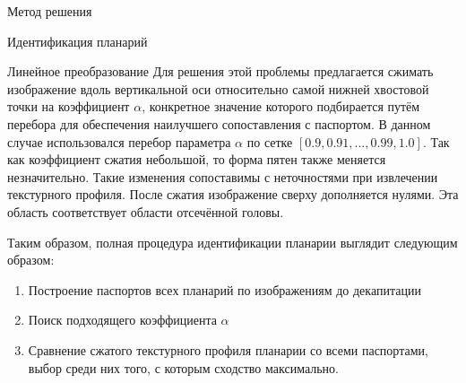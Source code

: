 \documentclass{article}
\begin{document}
\begin{section}{Метод решения}
\begin{subsection}{Идентификация планарий}
\begin{subsubsection}{Линейное преобразование}
Для решения этой проблемы предлагается сжимать изображение вдоль вертикальной оси относительно самой нижней хвостовой точки на коэффициент $\alpha$, конкретное значение которого подбирается путём перебора для обеспечения наилучшего сопоставления с паспортом. В данном случае использовался перебор параметра $\alpha$ по сетке $[0.9, 0.91, ..., 0.99, 1.0]$. Так как коэффициент сжатия небольшой, то форма пятен также меняется незначительно. Такие изменения сопоставимы с неточностями при извлечении текстурного профиля.
После сжатия изображение сверху дополняется нулями. Эта область соответствует области отсечённой головы.
    
\end{subsubsection}

Таким образом, полная процедура идентификации планарии выглядит следующим образом:

\begin{enumerate}
    \item Построение паспортов всех планарий по изображениям до декапитации
    \item Поиск подходящего коэффициента $\alpha
    $
    \item Сравнение сжатого текстурного профиля планарии со всеми паспортами, выбор среди них того, с которым сходство максимально.
\end{enumerate}
    
\end{subsection}

\end{section}
\end{document}

